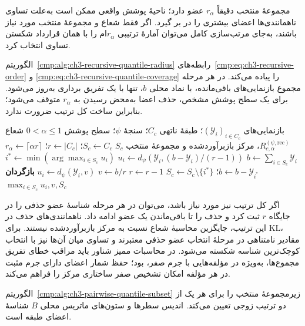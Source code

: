 مجموعهٔ منتخب دقیقاً $r_\alpha$ عضو دارد؛ ناحیهٔ
پوشش واقعی ممکن است به‌علت تساوی ناهمانندی‌ها اعضای
بیشتری را در بر گیرد. اگر فقط شعاع و مجموعهٔ منتخب
مورد نیاز باشند، به‌جای مرتب‌سازی کامل می‌توان
آمارهٔ ترتیبی $r_\alpha$ام را با همان قرارداد شکستن
تساوی انتخاب کرد.

الگوریتم~\ref{cmp:alg:ch3-recursive-quantile-radius}
رابطه‌های~\eqref{cmp:eq:ch3-recursive-order} و
\eqref{cmp:eq:ch3-recursive-quantile-coverage}
را پیاده می‌کند. در هر مرحله مجموع بازنمایی‌های
باقی‌مانده، با نماد محلی $b$، تنها با یک تفریق
برداری به‌روز می‌شود. برای یک سطح پوشش مشخص،
حذف اعضا به‌محض رسیدن به $r_\alpha$ متوقف
می‌شود؛ بنابراین ساخت کل ترتیب ضرورت ندارد.

\begin{algorithm}[!htbp]
\caption{زیرروال $\operatorname{RecursiveQuantileRadius}$: شعاع چندکی با بازبرآورد مرکز}
\label{cmp:alg:ch3-recursive-quantile-radius}
\begin{algorithmic}[1]
\REQUIRE بازنمایی‌های $(\mathscr Y_i)_{i\in C_c}$؛ طبقهٔ ناتهی $C_c$؛ سنجهٔ $\psi$؛ سطح پوشش $0<\alpha\le1$
\ENSURE شعاع $R_{c,\alpha}^{(\psi,\mathrm{rec})}$، مرکز بازبرآوردشده و مجموعهٔ منتخب $S_c$
\STATE $S_c\gets C_c$؛ $r\gets|C_c|$؛ $r_\alpha\gets\lceil\alpha r\rceil$
\STATE $b\gets\sum_{i\in S_c}\mathscr Y_i$
        \STATE $u_i\gets d_\psi(\mathscr Y_i,(b-\mathscr Y_i)/(r-1))$
    \ENDFOR
    \STATE $i^*\gets\min(\arg\max_{i\in S_c}u_i)$
    \STATE $b\gets b-\mathscr Y_{i^*}$؛ $S_c\gets S_c\setminus\{i^*\}$
    \STATE $r\gets r-1$
\ENDWHILE
\STATE $v\gets b/r$
    \STATE $u_i\gets d_\psi(\mathscr Y_i,v)$
\ENDFOR
\STATE \textbf{بازگردان} $\max_{i\in S_c}u_i,v,S_c$
\end{algorithmic}
\end{algorithm}

اگر کل ترتیب نیز مورد نیاز باشد، می‌توان در
هر مرحله شناسهٔ عضو حذفی را در جایگاه $r$ ثبت
کرد و حذف را تا باقی‌ماندن یک عضو ادامه داد.
ناهمانندی‌های حذف در این ترتیب، جایگزین محاسبهٔ
شعاع نسبت به مرکز بازبرآوردشده نیستند.
برای KL، مقادیر نامتناهی در مرحلهٔ انتخاب عضو
حذفی معتبرند و تساوی میان آن‌ها نیز با انتخاب
کوچک‌ترین شناسه شکسته می‌شود. در محاسبات ممیز
شناور باید مراقب خطای تفریق مجموع‌ها، به‌ویژه
در مؤلفه‌هایی با جرم صفر، بود؛ حفظ شمار اعضای
دارای جرم مثبت در هر مؤلفه امکان تشخیص صفر
ساختاری مرکز را فراهم می‌کند.

الگوریتم~\ref{cmp:alg:ch3-pairwise-quantile-subset}
زیرمجموعهٔ منتخب را برای هر یک از دو ترتیب زوجی
تعیین می‌کند. اندیس سطرها و ستون‌های ماتریس
محلی $B$ شناسهٔ اعضای طبقه است.

